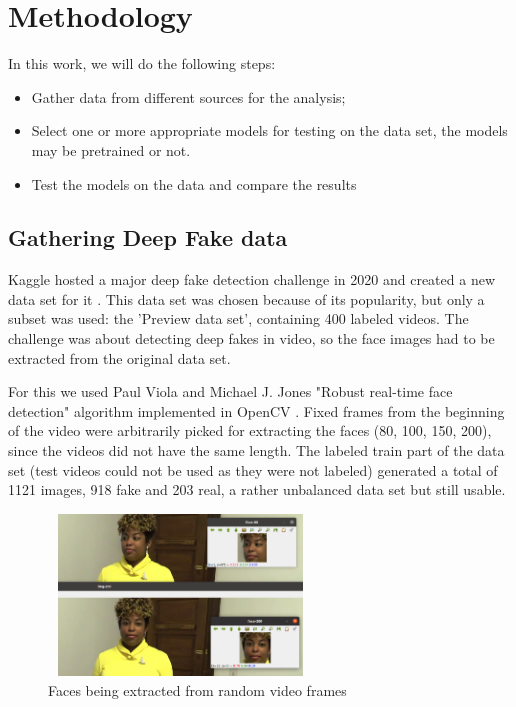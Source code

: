\documentclass{bmvc2k}
\begin{document}
\section{Methodology}
\label{sec:depth}
In this work, we will do the following steps:

\begin{itemize}
  \item Gather data from different sources for the analysis;
  \item Select one or more appropriate models for testing on the data set, the models may be pretrained or not.
  \item Test the models on the data and compare the results
\end{itemize}

\subsection{Gathering Deep Fake data}

Kaggle hosted a major deep fake detection challenge in 2020 and created a new data set for it \cite{dolhansky2019deepfake}. This data set was chosen because of its popularity, but only a subset was used:  the 'Preview data set', containing 400 labeled videos. The challenge was about detecting deep fakes in video, so the face images had to be extracted from the original data set.

For this we used Paul Viola and Michael J. Jones "Robust real-time face detection" algorithm implemented in OpenCV \cite{violajones04}. Fixed frames from the beginning of the video were arbitrarily picked for extracting the faces (80, 100, 150, 200), since the videos did not have the same length. The labeled train part of the data set (test videos could not be used as they were not labeled) generated a total of 1121 images, 918 fake and 203 real, a rather unbalanced data set but still usable.

\begin{figure}[!h]
\centering
\includegraphics[width=7.0cm, height=4.3cm]{face-extraction.png}
    \caption{Faces being extracted from random video frames}
\end{figure}
\end{document}
